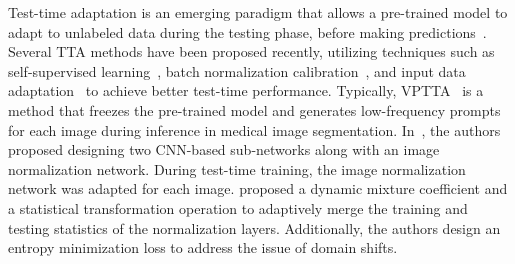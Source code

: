 Test-time adaptation is an emerging paradigm that allows a pre-trained model to adapt to unlabeled data during the testing phase, before making predictions~\cite{liang2024comprehensive}.
Several TTA methods have been proposed recently, utilizing techniques such as self-supervised learning~\cite{chen2023improved,kundu2022concurrent,zhang2022memo}, batch normalization calibration~\cite{zhang2023domainadaptor,chen2024each,zou2022learning,schneider2020improving,nado2020evaluating}, and input data adaptation~\cite{shu2022test,karani2021test} to achieve better test-time performance. Typically, VPTTA~\cite{chen2024each} is a method that freezes the pre-trained model and generates low-frequency prompts for each image during inference in medical image segmentation. In~\cite{karani2021test}, the authors proposed designing two CNN-based sub-networks along with an image normalization network. During test-time training, the image normalization network was adapted for each image. \cite{zhang2023domainadaptor} proposed a dynamic mixture coefficient and a statistical transformation operation to adaptively merge the training and testing statistics of the normalization layers. Additionally, the authors design an entropy minimization loss to address the issue of domain shifts. 
